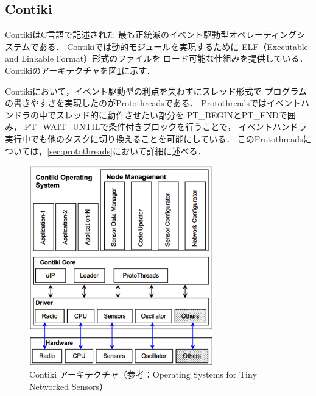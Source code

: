 \subsection{Contiki}
Contiki\cite{Dunkels:2004:CLF:1032658.1034117}はC言語で記述された
最も正統派のイベント駆動型オペレーティングシステムである．
Contikiでは動的モジュールを実現するために
ELF（Executable and Linkable Format）形式のファイルを
ロード可能な仕組みを提供している\cite{Dunkels06run-timedynamic}．
Contikiのアーキテクチャを図\ref{fig:system_conf_of_contiki}に示す．



Contikiにおいて，イベント駆動型の利点を失わずにスレッド形式で
プログラムの書きやすさを実現したのがProtothreads\cite{Dunkels:2006:PSE:1182807.1182811}である．
Protothreadsではイベントハンドラの中でスレッド的に動作させたい部分を
PT\_BEGINとPT\_ENDで囲み，
PT\_WAIT\_UNTILで条件付きブロックを行うことで，
イベントハンドラ実行中でも他のタスクに切り換えることを可能にしている．
このProtothreadsについては，\ref{sec:protothreads}において詳細に述べる．


\begin{figure}[htbp]
 \begin{center}
  \includegraphics[width=80mm]{./images/system_conf_of_contiki.eps}
 \end{center}
 \caption{Contiki アーキテクチャ（参考：Operating Systems for Tiny Networked Sensors\cite{Dwivedi_operatingsystems}）}
 \label{fig:system_conf_of_contiki}
\end{figure}




